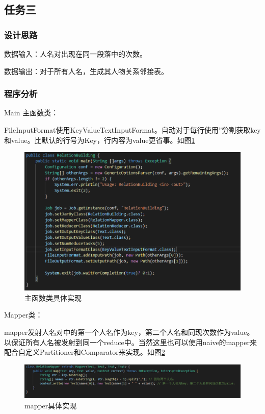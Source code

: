 \documentclass[a4paper,UTF8]{article}
\numberwithin{equation}{section}
\begin{document}
\subsection{任务三}
\subsubsection{设计思路}
\par 数据输入：人名对出现在同一段落中的次数。
\par 数据输出：对于所有人名，生成其人物关系邻接表。

\subsubsection{程序分析}
Main 主函数类：
\par FileInputFormat使用KeyValueTextInputFormat。自动对于每行使用'\t'分割获取key和value。比默认的行号为Key，行内容为value更省事。如图\ref{task3-Main}
\begin{figure}[htbp]
	\centering
	\includegraphics[width = 15cm]{task3-Main.png}
	\caption{主函数类具体实现}
	\label{task3-Main}
\end{figure}

\par Mapper类：
\par mapper发射人名对中的第一个人名作为key，第二个人名和同现次数作为value。以保证所有人名被发射到同一个reduce中。当然这里也可以使用naive的mapper来配合自定义Partitioner和Comparator来实现。如图\ref{task3-mapper}
\begin{figure}[htbp]
	\centering
	\includegraphics[width = 15cm]{task3-mapper.png}
	\caption{mapper具体实现}
	\label{task3-mapper}
\end{figure}
\end{document}
